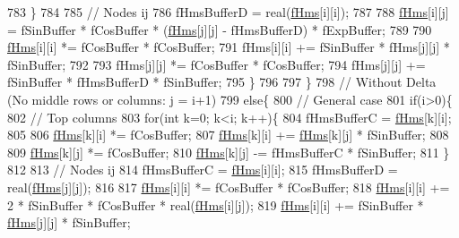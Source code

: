 \begin{DoxyCode}
783       \}
784 
785       \textcolor{comment}{// Nodes ij}
786       fHmsBufferD = real(\hyperlink{classOscProb_1_1PMNS__Base_adf5901166216e8c7a5cff2092952f473}{fHms}[i][i]);
787 
788       \hyperlink{classOscProb_1_1PMNS__Base_adf5901166216e8c7a5cff2092952f473}{fHms}[i][j] = fSinBuffer * fCosBuffer * (\hyperlink{classOscProb_1_1PMNS__Base_adf5901166216e8c7a5cff2092952f473}{fHms}[j][j] - fHmsBufferD) * fExpBuffer;
789 
790       \hyperlink{classOscProb_1_1PMNS__Base_adf5901166216e8c7a5cff2092952f473}{fHms}[i][i] *= fCosBuffer * fCosBuffer;
791       fHms[i][i] += fSinBuffer * fHms[j][j] * fSinBuffer;
792 
793       fHms[j][j] *= fCosBuffer * fCosBuffer;
794       fHms[j][j] += fSinBuffer * fHmsBufferD * fSinBuffer;
795     \}
796 
797   \}
798   \textcolor{comment}{// Without Delta (No middle rows or columns: j = i+1)}
799   \textcolor{keywordflow}{else}\{
800     \textcolor{comment}{// General case}
801     \textcolor{keywordflow}{if}(i>0)\{
802       \textcolor{comment}{// Top columns}
803       \textcolor{keywordflow}{for}(\textcolor{keywordtype}{int} k=0; k<i; k++)\{
804         fHmsBufferC = \hyperlink{classOscProb_1_1PMNS__Base_adf5901166216e8c7a5cff2092952f473}{fHms}[k][i];
805 
806         \hyperlink{classOscProb_1_1PMNS__Base_adf5901166216e8c7a5cff2092952f473}{fHms}[k][i] *= fCosBuffer;
807         \hyperlink{classOscProb_1_1PMNS__Base_adf5901166216e8c7a5cff2092952f473}{fHms}[k][i] += \hyperlink{classOscProb_1_1PMNS__Base_adf5901166216e8c7a5cff2092952f473}{fHms}[k][j] * fSinBuffer;
808 
809         \hyperlink{classOscProb_1_1PMNS__Base_adf5901166216e8c7a5cff2092952f473}{fHms}[k][j] *= fCosBuffer;
810         \hyperlink{classOscProb_1_1PMNS__Base_adf5901166216e8c7a5cff2092952f473}{fHms}[k][j] -= fHmsBufferC * fSinBuffer;
811       \}
812 
813       \textcolor{comment}{// Nodes ij}
814       fHmsBufferC = \hyperlink{classOscProb_1_1PMNS__Base_adf5901166216e8c7a5cff2092952f473}{fHms}[i][i];
815       fHmsBufferD = real(\hyperlink{classOscProb_1_1PMNS__Base_adf5901166216e8c7a5cff2092952f473}{fHms}[j][j]);
816 
817       \hyperlink{classOscProb_1_1PMNS__Base_adf5901166216e8c7a5cff2092952f473}{fHms}[i][i] *= fCosBuffer * fCosBuffer;
818       \hyperlink{classOscProb_1_1PMNS__Base_adf5901166216e8c7a5cff2092952f473}{fHms}[i][i] += 2 * fSinBuffer * fCosBuffer * real(\hyperlink{classOscProb_1_1PMNS__Base_adf5901166216e8c7a5cff2092952f473}{fHms}[i][j]);
819       \hyperlink{classOscProb_1_1PMNS__Base_adf5901166216e8c7a5cff2092952f473}{fHms}[i][i] += fSinBuffer * \hyperlink{classOscProb_1_1PMNS__Base_adf5901166216e8c7a5cff2092952f473}{fHms}[j][j] * fSinBuffer;

\end{DoxyCode}
